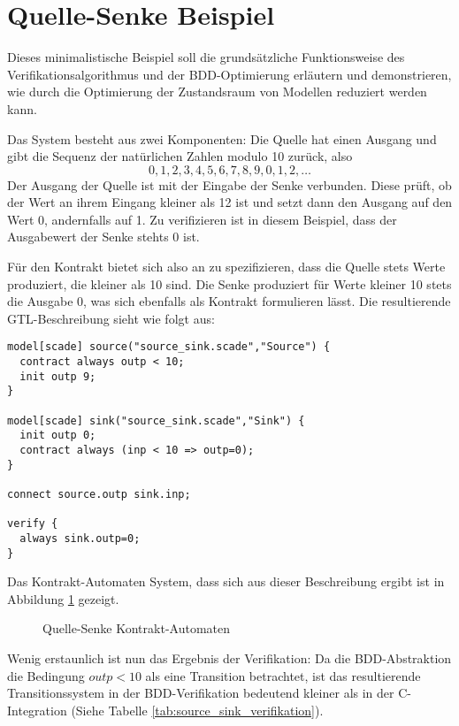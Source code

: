 \section{Quelle-Senke Beispiel}
Dieses minimalistische Beispiel soll die grundsätzliche Funktionsweise des Verifikationsalgorithmus und der BDD-Optimierung erläutern und demonstrieren, wie durch die Optimierung der Zustandsraum von Modellen reduziert werden kann.

Das System besteht aus zwei Komponenten:
Die Quelle hat einen Ausgang und gibt die Sequenz der natürlichen Zahlen modulo 10 zurück, also
\[ 0,1,2,3,4,5,6,7,8,9,0,1,2,\dots \]
Der Ausgang der Quelle ist mit der Eingabe der Senke verbunden.
Diese prüft, ob der Wert an ihrem Eingang kleiner als 12 ist und setzt dann den Ausgang auf den Wert 0, andernfalls auf 1.
Zu verifizieren ist in diesem Beispiel, dass der Ausgabewert der Senke stehts 0 ist.

Für den Kontrakt bietet sich also an zu spezifizieren, dass die Quelle stets Werte produziert, die kleiner als 10 sind.
Die Senke produziert für Werte kleiner 10 stets die Ausgabe 0, was sich ebenfalls als Kontrakt formulieren lässt.
Die resultierende GTL-Beschreibung sieht wie folgt aus:
\begin{lstlisting}[language=gtl]
model[scade] source("source_sink.scade","Source") {
  contract always outp < 10;
  init outp 9;
}

model[scade] sink("source_sink.scade","Sink") {
  init outp 0;
  contract always (inp < 10 => outp=0);
}

connect source.outp sink.inp;

verify {
  always sink.outp=0;
}
\end{lstlisting}
Das Kontrakt-Automaten System, dass sich aus dieser Beschreibung ergibt ist in Abbildung \ref{fig:source_sink_automata} gezeigt.

\begin{figure}[h]
  \centering
  \begin{tikzpicture}
    
  \end{tikzpicture}
  \caption{Quelle-Senke Kontrakt-Automaten}
  \label{fig:source_sink_automata}
\end{figure}

Wenig erstaunlich ist nun das Ergebnis der Verifikation:
Da die BDD-Abstraktion die Bedingung $\mathit{outp}<10$ als eine Transition betrachtet, ist das resultierende Transitionssystem in der BDD-Verifikation bedeutend kleiner als in der C-Integration (Siehe Tabelle \ref{tab:source_sink_verifikation}).

